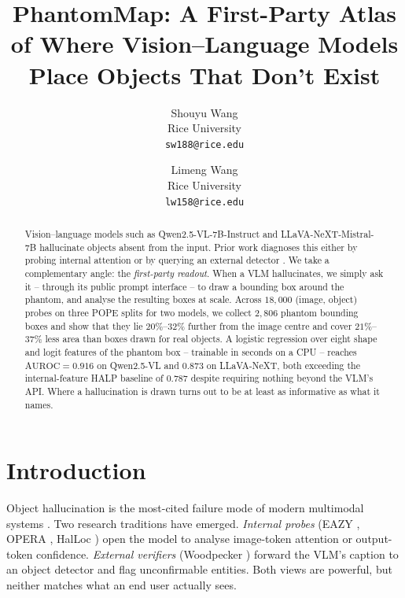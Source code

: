 \documentclass[10pt,twocolumn,letterpaper]{article}
\begin{document}
\title{PhantomMap: A First-Party Atlas of Where Vision--Language Models Place Objects That Don't Exist}

\author{%
  Shouyu Wang \\
  Rice University\\
  {\tt\small sw188@rice.edu}
  \and
  Limeng Wang \\
  Rice University\\
  {\tt\small lw158@rice.edu}
}

\maketitle

\begin{abstract}
   Vision--language models such as Qwen2.5-VL-7B-Instruct
   \cite{qwen25vl} and LLaVA-NeXT-Mistral-7B \cite{llavanext}
   hallucinate objects absent from the input. Prior work diagnoses
   this either by probing internal attention \cite{eazy,opera,halloc}
   or by querying an external detector \cite{woodpecker}. We take a
   complementary angle: the \emph{first-party readout}. When a VLM
   hallucinates, we simply ask it -- through its public prompt
   interface -- to draw a bounding box around the phantom, and analyse
   the resulting boxes at scale. Across $18{,}000$ (image, object)
   probes on three POPE \cite{pope} splits for two models, we collect
   $2{,}806$ phantom bounding boxes and show that they lie
   $20\%$--$32\%$ further from the image centre and cover
   $21\%$--$37\%$ less area than boxes drawn for real objects.
   A logistic regression over eight shape and logit features of the
   phantom box -- trainable in seconds on a CPU -- reaches
   $\mathrm{AUROC}=0.916$ on Qwen2.5-VL and $0.873$ on LLaVA-NeXT,
   both exceeding the internal-feature HALP baseline of $0.787$
   \cite{halp} despite requiring nothing beyond the VLM's API. Where a
   hallucination is drawn turns out to be at least as informative as
   what it names.
\end{abstract}

\section{Introduction}

Object hallucination is the most-cited failure mode of modern
multimodal systems \cite{hallsurvey,pope}. Two research traditions
have emerged. \emph{Internal probes} (EAZY \cite{eazy}, OPERA
\cite{opera}, HalLoc \cite{halloc}) open the model to analyse
image-token attention or output-token confidence. \emph{External
verifiers} (Woodpecker \cite{woodpecker}) forward the VLM's caption to
an object detector and flag unconfirmable entities. Both views are
powerful, but neither matches what an end user actually sees.
\end{document}
